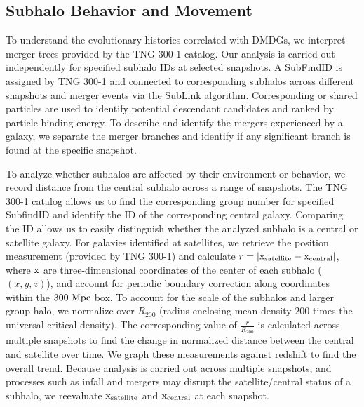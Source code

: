 \documentclass[twocolumn]{openjournal}
\begin{document}
\subsection{Subhalo Behavior and Movement} \label{Subhalo Behavior and Movement}
To understand the evolutionary histories correlated with DMDGs, we interpret merger trees provided by the TNG 300-1 catalog. Our analysis is carried out independently for specified subhalo IDs at selected snapshots. A SubFindID is assigned by TNG 300-1 and connected to corresponding subhalos across different snapshots and merger events via the SubLink algorithm. Corresponding or shared particles are used to identify potential descendant candidates and ranked by particle binding-energy. To describe and identify the mergers experienced by a galaxy, we separate the merger branches and identify if any significant branch is found at the specific snapshot. 

To analyze whether subhalos are affected by their environment or behavior, we record distance from the central subhalo across a range of snapshots. The TNG 300-1 catalog allows us to find the corresponding group number for specified SubfindID and identify the ID of the corresponding central galaxy. Comparing the ID allows us to easily distinguish whether the analyzed subhalo is a central or satellite galaxy. For galaxies identified at satellites, we retrieve the position measurement (provided by TNG 300-1) and calculate $r=|\textup{x}_\textup{satellite}-\textup{x}_\textup{central}|$, where $\textup{x}$ are three-dimensional coordinates of the center of each subhalo ($(x,y,z)$), and account for periodic boundary correction along coordinates within the $300 \textup{ Mpc}$ box. To account for the scale of the subhalos and larger group halo, we normalize over $R_{200}$ (radius enclosing mean density $200$ times the universal critical density). The corresponding value of $\frac{r}{R_{200}}$ is calculated across multiple snapshots to find the change in normalized distance between the central and satellite over time. We graph these measurements against redshift to find the overall trend. Because analysis is carried out across multiple snapshots, and processes such as infall and mergers may disrupt the satellite/central status of a subhalo, we reevaluate $\textup{x}_\textup{satellite}$ and $\textup{x}_\textup{central}$ at each snapshot. \cite{10.1111/j.1365-2966.2005.09543.x} 
\end{document}
